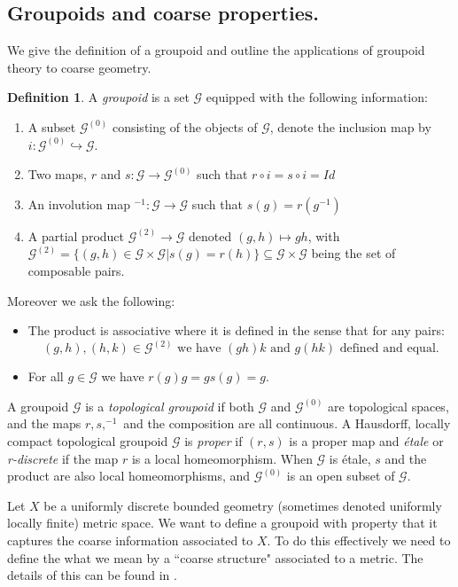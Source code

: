 \documentclass[11pt]{amsart}
\theoremstyle{plain}
\theoremstyle{definition}%
\newtheorem{definition}[theorem]{Definition}%
\theoremstyle{remark}%
\newcommand{\G}{\mathcal{G}}
\begin{document}
\subsection{Groupoids and coarse properties.}\label{sect:coarsegroupoids}
We give the definition of a groupoid and outline the applications of groupoid theory to coarse geometry.
\begin{definition}\label{def:grpoid2}
A \textit{groupoid} is a set $\G$ equipped with the following information:
\begin{enumerate}
\item A subset $\G^{(0)}$ consisting of the objects of $\G$, denote the inclusion map by $i: \G^{(0)}\hookrightarrow \G$. 
\item Two maps, $r$ and $s: \G  \rightarrow \G^{(0)}$ such that $r\circ i = s \circ i = Id$ 
\item An involution map $^{-1}:\G \rightarrow \G$ such that $s(g)=r(g^{-1})$
\item A partial product $\G^{(2)} \rightarrow \G$ denoted $(g,h) \mapsto gh$, with $\G^{(2)}=\lbrace (g,h) \in \G \times \G | s(g)=r(h) \rbrace\subseteq \G\times \G$ being the set of composable pairs.
\end{enumerate}
Moreover we ask the following:
\begin{itemize}
\item The product is associative where it is defined in the sense that for any pairs: 
\begin{equation*}
(g,h),(h,k)\in \G^{(2)} \mbox{ we have }(gh)k \mbox{ and } g(hk) \mbox{ defined and equal}.
\end{equation*}
\item For all $g \in \G$ we have $r(g)g=gs(g)=g$.
\end{itemize}
\end{definition}

A groupoid $\G$ is a \textit{topological groupoid} if both $\G$ and $\G^{(0)}$ are topological spaces, and the maps $r,s, ^{-1}$ and the composition are all continuous. A Hausdorff, locally compact topological groupoid $\G$ is \textit{proper} if $(r,s)$ is a proper map and \textit{\'etale} or \textit{r-discrete} if the map $r$ is a local homeomorphism. When $\G$ is \'etale, $s$ and the product are also local homeomorphisms, and $\G^{(0)}$ is an open subset of $\G$.

Let $X$ be a uniformly discrete bounded geometry (sometimes denoted uniformly locally finite) metric space. We want to define a groupoid with property that it captures the coarse information associated to $X$. To do this effectively we need to define the what we mean by a ``coarse structure" associated to a metric. The details of this can be found in \cite{MR2007488}.
\end{document}
